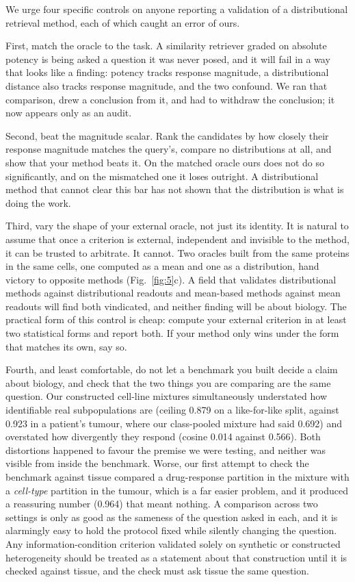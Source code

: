 \documentclass[11pt,letterpaper]{article}
\begin{document}
We urge four specific controls on anyone reporting a validation of a distributional retrieval
method, each of which caught an error of ours.

First, match the oracle to the task. A similarity retriever graded on absolute potency is
being asked a question it was never posed, and it will fail in a way that looks like a finding:
potency tracks response magnitude, a distributional distance also tracks response magnitude, and
the two confound. We ran that comparison, drew a conclusion from it, and had to withdraw the
conclusion; it now appears only as an audit.

Second, beat the magnitude scalar. Rank the candidates by how closely their response
magnitude matches the query's, compare no distributions at all, and show that your method beats it.
On the matched oracle ours does not do so significantly, and on the mismatched one it loses
outright. A distributional method that cannot clear this bar has not shown that the distribution is
what is doing the work.

Third, vary the shape of your external oracle, not just its identity. It is natural to
assume that once a criterion is external, independent and invisible to the method, it can be
trusted to arbitrate. It cannot. Two oracles built from the same proteins in the same cells, one
computed as a mean and one as a distribution, hand victory to opposite methods (Fig.~\ref{fig:5}c).
A field that validates distributional methods against distributional readouts and mean-based methods
against mean readouts will find both vindicated, and neither finding will be about biology. The
practical form of this control is cheap: compute your external criterion in at least two statistical
forms and report both. If your method only wins under the form that matches its own, say so.

Fourth, and least comfortable, do not let a benchmark you built decide a claim about
biology, and check that the two things you are comparing are the same question. Our constructed
cell-line mixtures simultaneously understated how identifiable real subpopulations are (ceiling
0.879 on a like-for-like split, against 0.923 in a patient's tumour, where our class-pooled
mixture had said 0.692) and overstated how divergently they respond (cosine 0.014 against 0.566).
Both distortions happened to favour the premise we were testing, and neither was visible from
inside the benchmark. Worse, our first attempt to check the benchmark against tissue compared a
drug-response partition in the mixture with a \emph{cell-type} partition in the tumour, which is a
far easier problem, and it produced a reassuring number (0.964) that meant nothing. A comparison
across two settings is only as good as the sameness of the question asked in each, and it is
alarmingly easy to hold the protocol fixed while silently changing the question. Any
information-condition criterion validated solely on synthetic or constructed heterogeneity should
be treated as a statement about that construction until it is checked against tissue, and the check
must ask tissue the same question.
\end{document}
